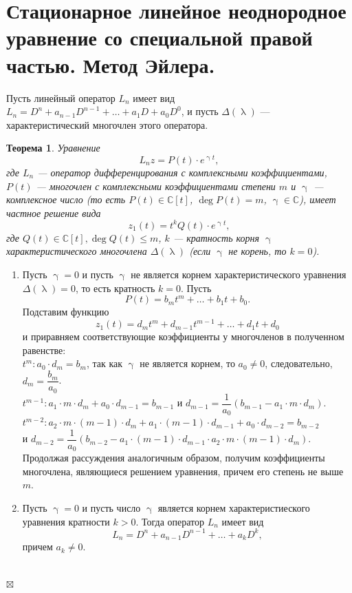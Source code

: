 \documentclass[a4paper, 12pt]{report}
\newenvironment{Proof} %
{\par\noindent{$\blacklozenge$}} %
{\hfill$\scriptstyle\boxtimes$}
\newcommand{\Cm}{\mathbb{C}}
\renewcommand{\lambda}{\uplambda}
\newcommand{\Ln}{L_n = D^n + a_{n-1}D^{n-1} + \ldots + a_1D + a_0D^0}
\begin{document}
\section{Стационарное линейное неоднородное уравнение со специальной правой частью. Метод Эйлера.}
Пусть линейный оператор $L_n$ имеет вид $\Ln$, и пусть $\Delta(\lambda)$ --- характеристический многочлен этого оператора.
\newtheorem*{2_5_1}{Теорема}\begin{2_5_1}
	Уравнение $$L_nz = P(t)\cdot e^{\upgamma t},$$ где $L_n$ --- оператор дифференцирования с комплексными коэффициентами, $P(t)$ --- многочлен с комплексными коэффициентами степени $m$ и $\upgamma$ --- комплексное число (то есть $P(t)\in\Cm[t]$, $\deg P(t) = m$, $\upgamma \in \Cm$), имеет частное решение вида $$z_1(t) = t^kQ(t)\cdot e^{\upgamma t},$$ где $Q(t) \in \Cm[t], \deg Q(t) \leqslant m$, $k$ --- кратность корня $\upgamma$ характеристического многочлена $\Delta(\lambda)$ (если $\upgamma$ не корень, то $k=0$).
\end{2_5_1}\begin{Proof}
\begin{enumerate}
	\item Пусть $\upgamma = 0$ и пусть $\upgamma$ не является корнем характеристического уравнения $\Delta(\lambda) = 0$, то есть кратность $k = 0$. Пусть $$P(t) = b_mt^m + \ldots + b_1t + b_0.$$ Подставим функцию $$z_1(t) = d_mt^m + d_{m-1}t^{m-1} + \ldots + d_1t + d_0$$ и приравняем соответствующие коэффициенты у многочленов в полученном равенстве:\\
	$t^m : a_0\cdot d_m = b_m$, так как $\upgamma$ не является корнем, то $a_0 \ne 0$, следовательно, $d_m = \dfrac{b_m}{a_0}$.\\
	$t^{m-1} : a_1\cdot m\cdot d_m + a_0\cdot  d_{m-1}= b_{m-1}$ и $d_{m-1} = \dfrac{1}{a_0}(b_{m-1} - a_1\cdot m \cdot d_m)$.\\
	$t^{m-2} : a_2\cdot m\cdot (m-1)\cdot d_m + a_1\cdot (m-1) \cdot d_{m-1} + a_0 \cdot d_{m-2} = b_{m-2}$\\ и $d_{m-2} = \dfrac{1}{a_0}(b_{m-2} - a_1\cdot (m-1)\cdot d_{m-1}\cdot a_2\cdot m\cdot (m-1)\cdot d_m)$.\\
	Продолжая рассуждения аналогичным образом, получим коэффициенты многочлена, являющиеся решением уравнения, причем его степень не выше $m$.
	\item Пусть $\upgamma = 0$ и пусть число $\upgamma$ является корнем характеристиеского уравнения кратности $k > 0$. Тогда оператор $L_n$ имеет вид $$L_n = D^n + a_{n-1}D^{n-1} + \ldots + a_k D^{k},$$ причем $a_k \ne 0$.\\\\

\end{enumerate}
\end{Proof}
\end{document}
